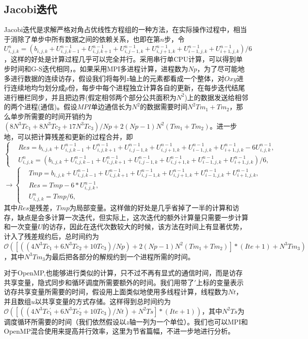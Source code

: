 \documentclass{article}
\newcommand{\mO}{\mathcal O}
\begin{document}
\subsection{Jacobi迭代\label{sec:2.2}}
Jacobi迭代是求解严格对角占优线性方程组的一种方法\cite{golub1996matrix}，在实际操作过程中，相当于消除了单步中所有数据之间的依赖关系，也即在第$n$步，令$U_{i,j,k}^n = (b_{i,j,k}+U_{i,j,k-1}^{n-1}+U_{i,j,k+1}^{n-1}+U_{i,j-1,k}^{n-1}+U_{i,j+1,k}^{n-1}+U_{i-1,j,k}^{n-1}+U_{i+1,j,k}^{n-1})/6$，这样的好处是计算过程几乎可以完全并行。采用串行单CPU计算，可以得到单步时间和G-S迭代相同，。如果采用MPI多进程计算，进程数为$Np$，为了尽可能地多进行数据的连续访存，假设我们将每列$z$轴上的元素都看成一个整体，对$Oxy$进行连续地均匀划分成$p$份，每步中每个进程独立计算各自的更新，在每步迭代结尾进行栅栏同步，并且把边界(假定相邻两个部分公共面积为$N^2$)上的数据发送给相邻的两个进程(通信)。假设$MPI$单边通信长为$N^2$的数据需要时间$N^2Tm_1+Tm_2$，那么单步所需要的时间开销约为$(8N^3Tc_1+8N^3Tc_2+17N^3Tc_3)/Np + 2(Np-1)N^2(Tm_1+Tm_2)$。进一步地，可以把计算残差和更新的过程合并，即
\begin{equation}
\left\{\begin{aligned}
	&Res= b_{i,j,k}+U_{i,j,k-1}^{n-1}+U_{i,j,k+1}^{n-1}+U_{i,j-1,k}^{n-1}+U_{i,j+1,k}^{n-1}+U_{i-1,j,k}^{n-1}+U_{i+1,j,k}^{n-1}-6U_{i,j,k}^{n-1},\\
&U_{i,j,k}^n = (b_{i,j,k}+U_{i,j,k-1}^{n-1}+U_{i,j,k+1}^{n-1}+U_{i,j-1,k}^{n-1}+U_{i,j+1,k}^{n-1}+U_{i-1,j,k}^{n-1}+U_{i+1,j,k}^{n-1})/6,
\end{aligned}\right.
\end{equation}
\begin{equation}\label{alg1}
\longrightarrow \left\{\begin{aligned}
&Tmp = b_{i,j,k}+U_{i,j,k-1}^{n-1}+U_{i,j,k+1}^{n-1}+U_{i,j-1,k}^{n-1}+U_{i,j+1,k}^{n-1}+U_{i-1,j,k}^{n-1}+U_{i+1,j,k}^{n-1},\\
&Res = Tmp-6*U_{i,j,k}^{n-1},\\
&U_{i,j,k}^n = Tmp/6,
\end{aligned}
\right.
\end{equation}
其中$Res$是残差，$Tmp$为局部变量。这样做的好处是几乎省掉了一半的计算和访存，缺点是会多计算一次迭代，但实际上，这次迭代的额外计算量只需要一步计算和一次变量$U$的访存，因此在迭代次数较大的时候，该方法在时间上有显著优势，计入了残差规约后，总时间约为$\mO([((4N^3Tc_1 + 6N^3Tc_2+10Tc_3)/Np)+2(Np-1)N^2(Tm_1+Tm_2) ]*(Ite+1) + N^3Tm_3)$，其中$N^3Tm_3$为最后把各部分的解规约到一个进程所需的时间。

对于OpenMP,也能够进行类似的计算，只不过不再有显式的通信时间，而是访存共享变量，隐式同步和循环调度所需要额外的时间。我们用带了$\prime$上标的变量表示访存共享变量所需要的时间，假设用上面类似地使用多线程计算，线程数为$Nt$，并且数组$u$以共享变量的方式存储。这样得到总时间约为$\mO([((4N^3Tc_1^\prime + 6N^3Tc_2^\prime +10Tc_3)/Nt) + N^2 Ts ]*(Ite+1) )$，其中$N^2Ts$为调度循环所需要的时间（我们依然假设以$z$轴一列为一个单位）。我们也可以MPI和OpenMP混合使用来提高并行效率，这里为节省篇幅，不进一步地进行分析。
\end{document}
